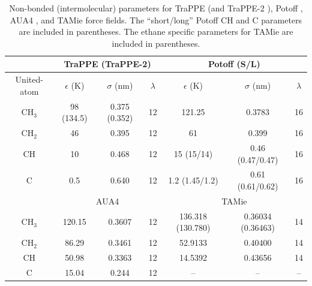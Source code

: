 \documentclass[preprint,letterpaper,floatfix,citeautoscript,aip,jcp]{revtex4-1}
\begin{document}
\begin{table}[h!]
	\caption{Non-bonded (intermolecular) parameters for TraPPE \cite{TraPPE,Martin1999} (and TraPPE-2 \cite{TraPPEUA2}), Potoff \cite{Mie,Potoff_branched}, AUA4 \cite{AUA4,Nieto2008}, and TAMie \cite{TAMie,Weidler2016} force fields. The ``short/long'' Potoff CH and C parameters are included in parentheses. 
The ethane specific parameters for TAMie are included in parentheses.} \label{tab:nonbonded params}
	\begin{center}
		\begin{tabular}{|c|c|c|c|c|c|c|}
			\hline
			\multicolumn{1}{|c}{} & \multicolumn{3}{|c}{TraPPE  (TraPPE-2)} & \multicolumn{3}{|c|}{Potoff (S/L)}  \\ \hline
			United-atom & $\epsilon$ (K) & $\sigma$ (nm) & $\lambda$ & $\epsilon$ (K) & $\sigma$ (nm) & $\lambda$ \\ \hline
			CH$_3$ & 98 (134.5)  & 0.375 (0.352) & 12 & 121.25 & 0.3783 & 16  \\ 
			CH$_2$ & 46 & 0.395 & 12 & 61 & 0.399 & 16 \\ 
			CH & 10 & 0.468 & 12 & 15 (15/14) & 0.46 (0.47/0.47) & 16\\
			C & 0.5 & 0.640 & 12 & 1.2 (1.45/1.2) & 0.61 (0.61/0.62) & 16\\
			\hline
			\multicolumn{1}{|c}{} & \multicolumn{3}{|c}{AUA4} & \multicolumn{3}{|c|}{TAMie} \\ \hline
			CH$_3$ & 120.15  & 0.3607 & 12 & 136.318 (130.780) & 0.36034 (0.36463) & 14 \\ 
			CH$_2$ & 86.29 & 0.3461 & 12 & 52.9133 & 0.40400 & 14 \\ 
			CH & 50.98 & 0.3363 & 12 & 14.5392 & 0.43656 & 14\\
			C & 15.04 & 0.244 & 12 & -- & -- & --\\
			\hline
		\end{tabular}
	\end{center} 
\end{table}
\end{document}
